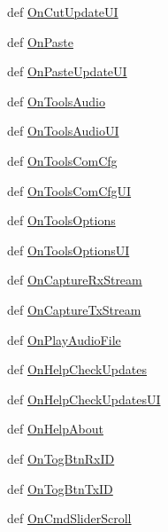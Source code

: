 \begin{DoxyCompactItemize}
\item 
def \hyperlink{classtop_frame_1_1_top_frame_a50d0051d981eab625207852bba01866c}{On\-Cut\-Update\-U\-I}
\item 
def \hyperlink{classtop_frame_1_1_top_frame_a36db96ac64019879247b7885f9a55652}{On\-Paste}
\item 
def \hyperlink{classtop_frame_1_1_top_frame_a3bd2532ab1a1ba4a47516a0454f8ed2c}{On\-Paste\-Update\-U\-I}
\item 
def \hyperlink{classtop_frame_1_1_top_frame_ae6c632a018c9b1a962601e9029468884}{On\-Tools\-Audio}
\item 
def \hyperlink{classtop_frame_1_1_top_frame_a95ef55689bd48a98ff8569d101cd18cb}{On\-Tools\-Audio\-U\-I}
\item 
def \hyperlink{classtop_frame_1_1_top_frame_a032088155c4dd9ec9004f0f53d49b41d}{On\-Tools\-Com\-Cfg}
\item 
def \hyperlink{classtop_frame_1_1_top_frame_ab85a2a0f430bc1f7b10db88b8d5a7f5c}{On\-Tools\-Com\-Cfg\-U\-I}
\item 
def \hyperlink{classtop_frame_1_1_top_frame_ab9cf5f0b175fea41a0737d30a691a2cc}{On\-Tools\-Options}
\item 
def \hyperlink{classtop_frame_1_1_top_frame_a781976de8bd8ed61197c9174e87e1476}{On\-Tools\-Options\-U\-I}
\item 
def \hyperlink{classtop_frame_1_1_top_frame_a6e6ef0ebc9ec5508f5ac334d20a4d7c5}{On\-Capture\-Rx\-Stream}
\item 
def \hyperlink{classtop_frame_1_1_top_frame_a8cd748674c23d12edc63c3ebe792e8a7}{On\-Capture\-Tx\-Stream}
\item 
def \hyperlink{classtop_frame_1_1_top_frame_a99d4ac5feab8afa58b91e9c19b2be90d}{On\-Play\-Audio\-File}
\item 
def \hyperlink{classtop_frame_1_1_top_frame_a299af3adf9efed97ae331cb12021d0d5}{On\-Help\-Check\-Updates}
\item 
def \hyperlink{classtop_frame_1_1_top_frame_af4d7b0000f9958bb959117efabd3e42e}{On\-Help\-Check\-Updates\-U\-I}
\item 
def \hyperlink{classtop_frame_1_1_top_frame_a80278edf47d97a1a1e95c907019a0aeb}{On\-Help\-About}
\item 
def \hyperlink{classtop_frame_1_1_top_frame_a573d7628c10e848e967b75ba30320823}{On\-Tog\-Btn\-Rx\-I\-D}
\item 
def \hyperlink{classtop_frame_1_1_top_frame_ad9956c7d67ec371df1403538c990af45}{On\-Tog\-Btn\-Tx\-I\-D}
\item 
def \hyperlink{classtop_frame_1_1_top_frame_aab9a89ec9db5d4eeeda24a70d89cbac5}{On\-Cmd\-Slider\-Scroll}

\end{DoxyCompactItemize}

